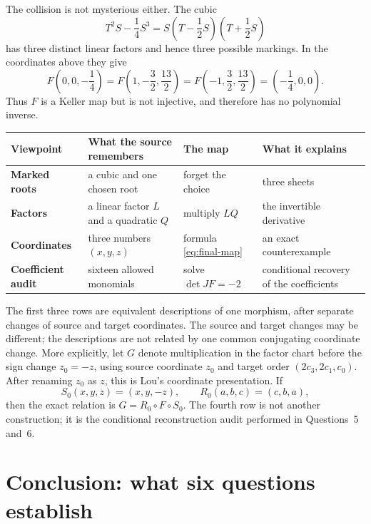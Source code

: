 \documentclass[11pt,a4paper]{article}
\numberwithin{equation}{section}
\theoremstyle{definition}
\theoremstyle{remark}
\begin{document}
The collision is not mysterious either.  The cubic
\[
  T^2S-\frac14S^3
  =S\left(T-\frac12S\right)\left(T+\frac12S\right)
\]
has three distinct linear factors and hence three possible markings.  In the
coordinates above they give
\begin{equation}\label{eq:collision}
F\left(0,0,-\frac14\right)
=F\left(1,-\frac32,\frac{13}{2}\right)
=F\left(-1,\frac32,\frac{13}{2}\right)
=\left(-\frac14,0,0\right).
\end{equation}
Thus \(F\) is a Keller map but is not injective, and therefore has no
polynomial inverse.

\begin{center}
\small
\begin{tabularx}{\linewidth}{@{}>{\bfseries}p{32mm}p{42mm}p{35mm}X@{}}
\toprule
Viewpoint&What the source remembers&The map&What it explains\\
\midrule
Marked roots&a cubic and one chosen root&forget the choice&three sheets\\
Factors&a linear factor \(L\) and a quadratic \(Q\)&multiply \(LQ\)&the
invertible derivative\\
Coordinates&three numbers \((x,y,z)\)&formula \eqref{eq:final-map}&an exact
counterexample\\
Coefficient audit&sixteen allowed monomials&solve \(\det JF=-2\)&conditional
recovery of the coefficients\\
\bottomrule
\end{tabularx}
\end{center}

The first three rows are equivalent descriptions of one morphism, after
separate changes of source and target coordinates.  The source and target
changes may be different; the descriptions are not related by one common
conjugating coordinate change.  More explicitly, let \(G\) denote
multiplication in the factor chart before the sign change \(z_0=-z\), using
source coordinate \(z_0\) and target order \((2c_3,2c_1,c_0)\).  After
renaming \(z_0\) as \(z\), this is Lou's coordinate presentation.  If
\[
 S_0(x,y,z)=(x,y,-z),
 \qquad
 R_0(a,b,c)=(c,b,a),
\]
then the exact relation is \(G=R_0\circ F\circ S_0\).  The fourth row is not
another construction; it is the conditional reconstruction audit performed
in Questions~5 and~6.

\section{Conclusion: what six questions establish}
\end{document}
